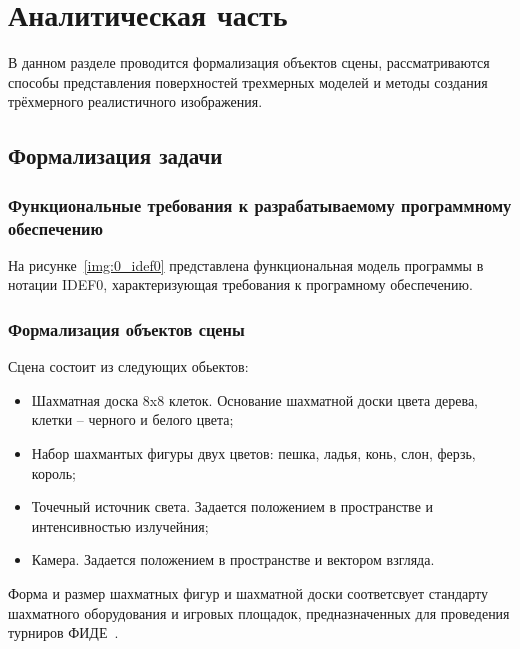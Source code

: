 \chapter{Аналитическая часть}


В данном разделе проводится формализация объектов сцены, рассматриваются способы представления поверхностей трехмерных моделей и методы создания трёхмерного реалистичного изображения.

\section{Формализация задачи}

\subsection{Функциональные требования к разрабатываемому программному обеспечению}
На рисунке~\ref{img:0_idef0} представлена функциональная модель программы в нотации IDEF0, характеризующая требования к програмному обеспечению.
\FloatBarrier
{}
\FloatBarrier

\subsection{Формализация объектов сцены}
Сцена состоит из следующих обьектов:
\begin{itemize}
	\item Шахматная доска 8x8 клеток. Основание шахматной доски цвета дерева, клетки -- черного и белого цвета;
	\item Набор шахмантых фигуры двух цветов: пешка, ладья, конь, слон, ферзь, король;
	\item Точечный источник света. Задается положением в пространстве и интенсивностью излучейния;
	\item Камера. Задается положением в пространстве и вектором взгляда.
\end{itemize}

Форма и размер шахматных фигур и шахматной доски соответсвует стандарту шахматного оборудования и игровых площадок, предназначенных для проведения турниров ФИДЕ~\cite{FIDE2015}.

\clearpage
